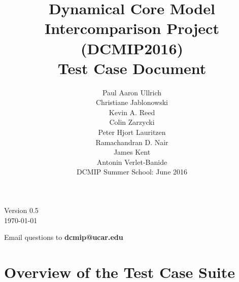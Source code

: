 \documentclass[times,doublespace]{fldauth}
\begin{document}
\setcounter{section}{-1}

\title{Dynamical Core Model Intercomparison Project (DCMIP2016) \\
 Test Case Document}
\author{Paul Aaron Ullrich \\ Christiane Jablonowski \\ Kevin A. Reed \\ Colin Zarzycki \\ Peter Hjort Lauritzen \\ Ramachandran D. Nair \\ James Kent \\Antonin Verlet-Banide \\ \vspace{3cm} DCMIP Summer School: June 2016}

\maketitle

\begin{center}
Version 0.5 \\
\today
\end{center}

\vspace{2cm}

\begin{center}
Email questions to \textbf{dcmip@ucar.edu}
\end{center}

\clearpage

\section*{Overview of the Test Case Suite}
\end{document}

